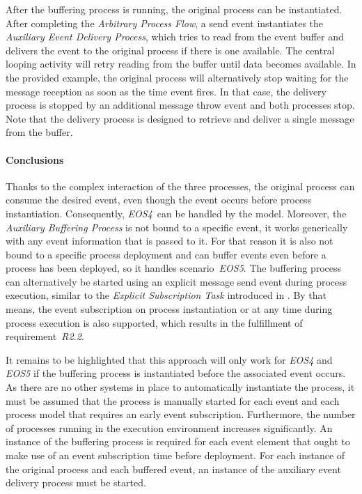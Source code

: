 After the buffering process is running, the original process can be instantiated. 
After completing the \textit{Arbitrary Process Flow}, a send event instantiates the \textit{Auxiliary Event Delivery Process}, which tries to read from the event buffer and delivers the event to the original process if there is one available. 
The central looping activity will retry reading from the buffer until data becomes available.
In the provided example, the original process will alternatively stop waiting for the message reception as soon as the time event fires. In that case, the delivery process is stopped by an additional message throw event and both processes stop.
Note that the delivery process is designed to retrieve and deliver a single message from the buffer.

\paragraph{Conclusions}
Thanks to the complex interaction of the three processes, the original process can consume the desired event, even though the event occurs before process instantiation. Consequently, \textit{EOS4}~can be handled by the model. 
Moreover, the \textit{Auxiliary Buffering Process} is not bound to a specific event, it works generically with any event information that is passed to it. For that reason it is also not bound to a specific process deployment and can buffer events even before a process has been deployed, so it handles scenario~\textit{EOS5}.
The buffering process can alternatively be started using an explicit message send event during process execution, similar to the \textit{Explicit Subscription Task} introduced in \cite{mandal:2017}. By that means, the event subscription on process instantiation or at any time during process execution is also supported, which results in the fulfillment of requirement~\textit{R2.2}.

It remains to be highlighted that this approach will only work for \textit{EOS4} and \textit{EOS5} if the buffering process is instantiated before the associated event occurs. As there are no other systems in place to automatically instantiate the process, it must be assumed that the process is manually started for each event and each process model that requires an early event subscription.
Furthermore, the number of processes running in the execution environment increases significantly. An instance of the buffering process is required for each event element that ought to make use of an event subscription time before deployment. For each instance of the original process and each buffered event, an instance of the auxiliary event delivery process must be started.

